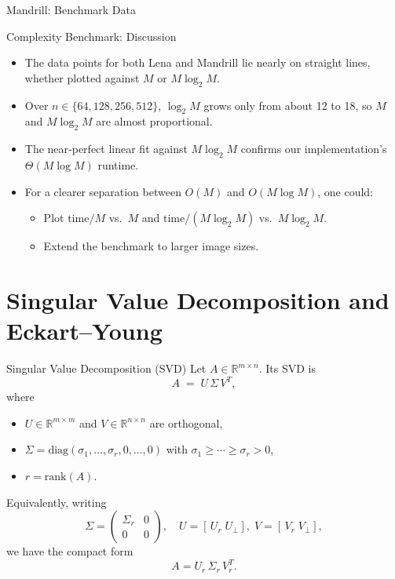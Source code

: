 \documentclass[12pt]{beamer}
\begin{document}
\begin{frame}{Mandrill: Benchmark Data}
  \small
  \normalsize
\end{frame}


\begin{frame}{Complexity Benchmark: Discussion}
  \begin{itemize}
    \item The data points for both Lena and Mandrill lie nearly on straight lines, whether plotted against \(M\) or \(M\log_2 M\).
    \item Over \(n\in\{64,128,256,512\}\), \(\log_2 M\) grows only from about 12 to 18, so \(M\) and \(M\log_2 M\) are almost proportional.
    \item The near‑perfect linear fit against \(M\log_2 M\) confirms our implementation’s \(\Theta(M\log M)\) runtime.
    \item For a clearer separation between \(O(M)\) and \(O(M\log M)\), one could:
      \begin{itemize}
        \item Plot \(\mathrm{time}/M\) vs.\ \(M\) and \(\mathrm{time}/(M\log_2 M)\) vs.\ \(M\log_2 M\).
        \item Extend the benchmark to larger image sizes.
      \end{itemize}
  \end{itemize}
\end{frame}











\section{Singular Value Decomposition and Eckart–Young}

\begin{frame}{Singular Value Decomposition (SVD)}
  Let \(A\in\mathbb{R}^{m\times n}\).  Its SVD is
  \[
    A \;=\; U\,\Sigma\,V^T,
  \]
  where
  \begin{itemize}
    \item \(U\in\mathbb{R}^{m\times m}\) and \(V\in\mathbb{R}^{n\times n}\) are orthogonal,
    \item \(\Sigma=\mathrm{diag}(\sigma_1,\dots,\sigma_r,0,\dots,0)\) with \(\sigma_1\ge\cdots\ge\sigma_r>0\),
    \item \(r=\mathrm{rank}(A)\).
  \end{itemize}
  Equivalently, writing
  \[
    \Sigma = \begin{pmatrix}\Sigma_r & 0\\[3pt]0 & 0\end{pmatrix},
    \quad
    U = [\,U_r\;U_\perp],\;
    V=[\,V_r\;V_\perp],
  \]
  we have the compact form
  \[
    A = U_r\,\Sigma_r\,V_r^T.
  \]
\end{frame}
\end{document}
